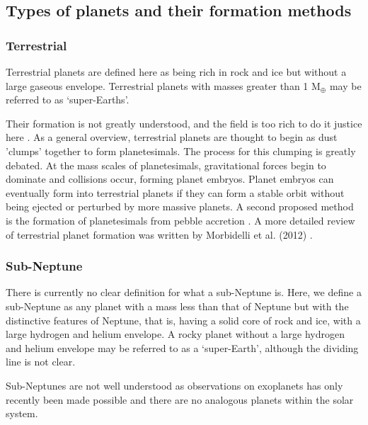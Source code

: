 \documentclass[a4paper,twocolumn,12pt]{article}
\begin{document}

\subsection{Types of planets and their formation methods}
\label{section: Planet formation}
\subsubsection{Terrestrial}
Terrestrial planets are defined here as being rich in rock and ice but without a large gaseous envelope. Terrestrial planets with masses greater than 1 M$ _\oplus$ may be referred to as `super-Earths'.

Their formation is not greatly understood, and the field is too rich to do it justice here \cite{EarthFormation}. As a general overview, terrestrial planets are thought to begin as dust 'clumps' together to form planetesimals.  The process for this clumping is greatly debated. At the mass scales of planetesimals, gravitational forces begin to dominate and collisions occur, forming planet embryos. Planet embryos can eventually form into terrestrial planets if they can form a stable orbit without being ejected or perturbed by more massive planets. A second proposed method is the formation of planetesimals from pebble accretion \cite{PebbleAccretion}. A more detailed review of terrestrial planet formation was written by Morbidelli et al. (2012) \cite{EarthFormation}. 

\subsubsection{Sub-Neptune}
\label{subsubsection: Sub-Neptunes}
There is currently no clear definition for what a sub-Neptune is. Here, we define a sub-Neptune as any planet with a mass less than that of Neptune but with the distinctive features of Neptune, that is, having a solid core of rock and ice, with a large hydrogen and helium envelope. A rocky planet without a large hydrogen and helium envelope may be referred to as a `super-Earth', although the dividing line is not clear.

Sub-Neptunes are not well understood as observations on exoplanets has only recently been made possible and there are no analogous planets within the solar system.
\end{document}
